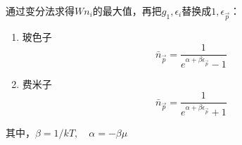 \documentclass[12pt, a4paper, oneside]{ctexbook}
\newcounter{#2}
\newcounter{#2}[#1]
\numberwithin{#2}{#1}
\begin{document}
          \begin{deduce}
            通过变分法求得\(W{n_i}\)的最大值，再把\(g_1,\epsilon_i\)替换成\(1,\epsilon_{\vec p}\)：
            \begin{enumerate}
              \item 玻色子
              \begin{equation}
                \bar{n}_{\vec{p}}=\frac{1}{e^{\alpha+\beta \epsilon_{\vec{p}}}-1}
              \end{equation}
              \item 费米子
              \begin{equation}
                \bar{n}_{\vec{p}}=\frac{1}{e^{\alpha+\beta \epsilon_{\vec{p}}}+1}  
              \end{equation}
            \end{enumerate}
            其中，\(\beta=1/kT,\quad\alpha=-\beta \mu\)
          \end{deduce}
          
\end{document}
